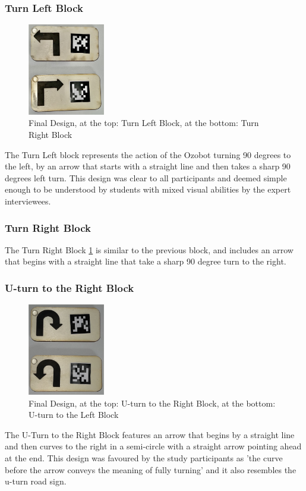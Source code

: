 \documentclass[oneside,%
                    author={Malak Hajji},
                    degree={BSc},
                    title={Designing An Accessible Computational Toolkit For Students},
                  subtitle={With Mixed Visual Abilities}]{dissertation}
\begin{document}
\subsubsection{Turn Left Block}
\FloatBarrier
\begin{figure}[h]
    \centering
    \includegraphics[width=0.3\textwidth]{thesis/leftright.eps}
    \caption{Final Design, at the top: Turn Left Block, at the bottom: Turn Right Block}
    \label{fig-leftright}
\end{figure}
\FloatBarrier
The Turn Left block represents the action of the Ozobot turning 90 degrees to the left, by an arrow that starts with a straight line and then takes a sharp 90 degrees left turn. This design was clear to all participants and deemed simple enough to be understood by students with mixed visual abilities by the expert interviewees.

\subsubsection{Turn Right Block}
The Turn Right Block \ref{fig-leftright} is similar to the previous block, and includes an arrow that begins with a straight line that take a sharp 90 degree turn to the right.

\subsubsection{U-turn to the Right Block}
\FloatBarrier
\begin{figure}[h]
    \centering
    \includegraphics[width=0.3\textwidth]{thesis/tuurn.eps}
    \caption{Final Design, at the top: U-turn to the Right Block, at the bottom: U-turn to the Left Block}
    \label{fig-alluturns}
\end{figure}
\FloatBarrier
The U-Turn to the Right Block features an arrow that begins by a straight line and then curves to the right in a semi-circle with a straight arrow pointing ahead at the end. This design was favoured by the study  participants as 'the curve before the arrow conveys the meaning of fully turning' and it also resembles the u-turn road sign.
\end{document}
